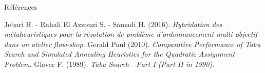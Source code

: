 \documentclass[10pt, handout]{beamer}
\begin{document}
\begin{frame}{Références}
    \begin{thebibliography}{9}
         Jebari H. - Rahali El Azzouzi S. - Samadi H. (2016). \textit{Hybridation des métaheuristiques pour la résolution de problème d’ordonnancement multi-objectif dans un atelier flow-shop}.
         Gerald Paul (2010). \textit{Comparative Performance of Tabu Search and Simulated Annealing Heuristics for the Quadratic Assignment Problem}.
         Glover F. (1989). \textit{Tabu Search—Part I (Part II in 1990)}.
    \end{thebibliography}
\end{frame}
\end{document}
